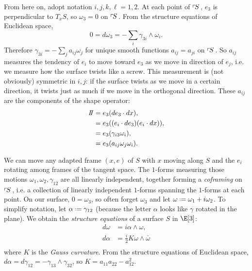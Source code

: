 From here on, adopt notation \(i,j,k,\ell=1,2\).
At each point of \(\left\ulcorner\!S\right.\), \(e_3\) is perpendicular to \(T_x S\), so \(\omega_3=0\) on \(\left\ulcorner\!S\right.\).
From the structure equations of Euclidean space,
\[ 
0=d\omega_3=-\sum_i \gamma_{3 i} \wedge \omega_i.
\]
Therefore \(\gamma_{3i}=-\sum_j a_{ij} \omega_j\) for unique smooth functions \(a_{ij}=a_{ji}\) on \(\left\ulcorner\!S\right.\).
So \(a_{ij}\) measures the tendency of \(e_i\) to move toward \(e_3\) as we move in direction of \(e_j\), i.e. we measure how the surface twists like a screw.
This measurement is (not obviously) symmetric in \(i,j\): if the surface twists as we move in a certain direction, it twists just as much if we move in the orthogonal direction.
These \(a_{ij}\) are the components of the shape operator:
\begin{align*}
\shapeOp&=
e_3(de_3 \cdot dx),
\\
&=
e_3((e_i \cdot de_3)(e_i \cdot dx)),
\\
&=
e_3(\gamma_{i3} \omega_i),
\\
&=
e_3(a_{ij}\omega_j\omega_i).
\end{align*}

We can move any adapted frame \((x,e)\) of \(S\) with \(x\) moving along \(S\) and the \(e_i\) rotating among frames of the tangent space.
The \(1\)-forms measuring those motions \(\omega_1, \omega_2, \gamma_{12}\) are all linearly independent, together forming a \emph{coframing} on \(\left\ulcorner\!S\right.\), i.e. a collection of linearly independent \(1\)-forms spanning the \(1\)-forms at each point.
On our surface, \(0=\omega_3\), so often forget \(\omega_3\) and let \(\omega\defeq\omega_1+i\omega_2\).
To simplify notation, let \(\alpha\defeq\gamma_{12}\) (because the letter \(\alpha\) looks like \(\gamma\) rotated in the plane).
We obtain the \emph{structure equations} of a surface \(S\) in \(\E[3]\):
\begin{align*}
d\omega&=i\alpha\wedge\omega,\\
d\alpha &= \frac{i}{2}K\omega\wedge\bar\omega\\
\end{align*}
where \(K\) is the \emph{Gauss curvature}.
From the structure equations of Euclidean space, 
\(d\alpha=d\gamma_{12} = -\gamma_{13}\wedge\gamma_{32}\), so 
\(K=a_{11}a_{22}-a_{12}^2\).

